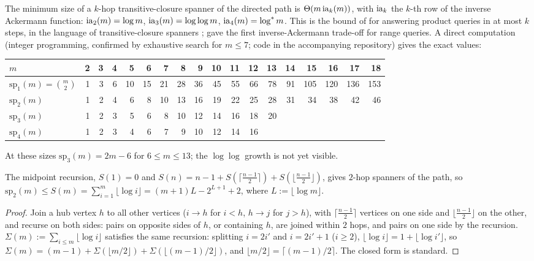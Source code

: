 The minimum size of a $k$-hop transitive-closure spanner of the directed path is $\Theta(m\,\mathrm{ia}_k(m))$, with $\mathrm{ia}_k$ the $k$-th row of the inverse Ackermann function: $\mathrm{ia}_2(m)=\log m$, $\mathrm{ia}_3(m)=\log\log m$, $\mathrm{ia}_4(m)=\log^*m$. This is the bound of \citet{alon1987optimal} for answering product queries in at most $k$ steps, in the language of transitive-closure spanners \citep{bhattacharyya2012transitive,berman2014steiner}; \citet{yao1982space} gave the first inverse-Ackermann trade-off for range queries. A direct computation (integer programming, confirmed by exhaustive search for $m\le7$; code in the accompanying repository) gives the exact values:
\begin{center}\small
\setlength{\tabcolsep}{3pt}
\begin{tabular}{@{}l*{17}{r}@{}}
\toprule
$m$ & 2 & 3 & 4 & 5 & 6 & 7 & 8 & 9 & 10 & 11 & 12 & 13 & 14 & 15 & 16 & 17 & 18\\
\midrule
$\mathrm{sp}_1(m)=\binom m2$ & 1 & 3 & 6 & 10 & 15 & 21 & 28 & 36 & 45 & 55 & 66 & 78 & 91 & 105 & 120 & 136 & 153\\
$\mathrm{sp}_2(m)$ & 1 & 2 & 4 & 6 & 8 & 10 & 13 & 16 & 19 & 22 & 25 & 28 & 31 & 34 & 38 & 42 & 46\\
$\mathrm{sp}_3(m)$ & 1 & 2 & 3 & 5 & 6 & 8 & 10 & 12 & 14 & 16 & 18 & 20 & & & & & \\
$\mathrm{sp}_4(m)$ & 1 & 2 & 3 & 4 & 6 & 7 & 9 & 10 & 12 & 14 & 16 & & & & & & \\
\bottomrule
\end{tabular}
\end{center}
At these sizes $\mathrm{sp}_3(m)=2m-6$ for $6\le m\le13$; the $\log\log$ growth is not yet visible.

\begin{proposition}\label{prop:shape:midpoint}
The midpoint recursion, $S(1)=0$ and $S(n)=n-1+S(\lceil\frac{n-1}2\rceil)+S(\lfloor\frac{n-1}2\rfloor)$, gives $2$-hop spanners of the path, so $\mathrm{sp}_2(m)\le S(m)=\sum_{i=1}^m\lfloor\log i\rfloor=(m+1)L-2^{L+1}+2$, where $L:=\lfloor\log m\rfloor$.
\end{proposition}

\begin{proof}
Join a hub vertex $h$ to all other vertices ($i\to h$ for $i<h$, $h\to j$ for $j>h$), with $\lceil\frac{n-1}2\rceil$ vertices on one side and $\lfloor\frac{n-1}2\rfloor$ on the other, and recurse on both sides: pairs on opposite sides of $h$, or containing $h$, are joined within $2$ hops, and pairs on one side by the recursion. $\Sigma(m):=\sum_{i\le m}\lfloor\log i\rfloor$ satisfies the same recursion: splitting $i=2i'$ and $i=2i'+1$ ($i\ge2$), $\lfloor\log i\rfloor=1+\lfloor\log i'\rfloor$, so $\Sigma(m)=(m-1)+\Sigma(\lfloor m/2\rfloor)+\Sigma(\lfloor(m-1)/2\rfloor)$, and $\lfloor m/2\rfloor=\lceil(m-1)/2\rceil$. The closed form is standard.
\end{proof}

